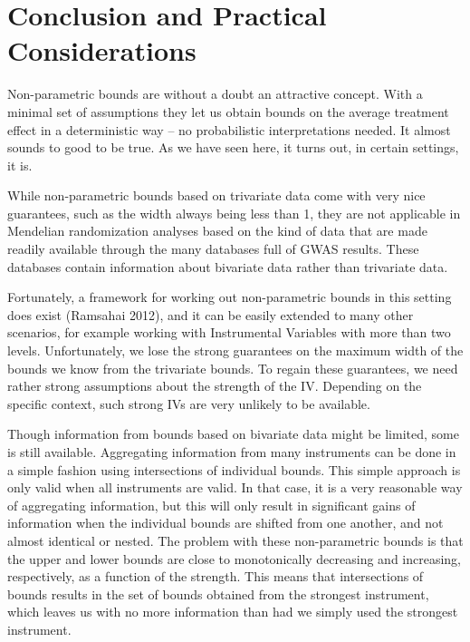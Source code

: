 \documentclass[
]{article}
\theoremstyle{plain}
\begin{document}
\newpage

\hypertarget{conclusion-and-practical-considerations}{%
\section{Conclusion and Practical Considerations}\label{conclusion-and-practical-considerations}}

Non-parametric bounds are without a doubt an attractive concept. With a minimal set of assumptions they let us obtain bounds on the average treatment effect in a deterministic way -- no probabilistic interpretations needed. It almost sounds to good to be true. As we have seen here, it turns out, in certain settings, it is.

While non-parametric bounds based on trivariate data come with very nice guarantees, such as the width always being less than 1, they are not applicable in Mendelian randomization analyses based on the kind of data that are made readily available through the many databases full of GWAS results. These databases contain information about bivariate data rather than trivariate data.

Fortunately, a framework for working out non-parametric bounds in this setting does exist (Ramsahai 2012), and it can be easily extended to many other scenarios, for example working with Instrumental Variables with more than two levels. Unfortunately, we lose the strong guarantees on the maximum width of the bounds we know from the trivariate bounds. To regain these guarantees, we need rather strong assumptions about the strength of the IV. Depending on the specific context, such strong IVs are very unlikely to be available.

Though information from bounds based on bivariate data might be limited, some is still available. Aggregating information from many instruments can be done in a simple fashion using intersections of individual bounds. This simple approach is only valid when all instruments are valid. In that case, it is a very reasonable way of aggregating information, but this will only result in significant gains of information when the individual bounds are shifted from one another, and not almost identical or nested. The problem with these non-parametric bounds is that the upper and lower bounds are close to monotonically decreasing and increasing, respectively, as a function of the strength. This means that intersections of bounds results in the set of bounds obtained from the strongest instrument, which leaves us with no more information than had we simply used the strongest instrument.
\end{document}

